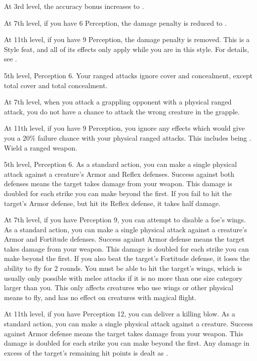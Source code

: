     At 3rd level, the accuracy bonus increases to .

    At 7th level, if you have 6 Perception, the damage penalty is reduced to .

    At 11th level, if you have 9 Perception, the damage penalty is removed.
     This is a Style feat, and all of its effects only apply while you are in this style.
    For details, see .

    \featpres 5th level, Perception 6.
    \featben Your ranged attacks ignore cover and concealment, except total cover and total concealment.

    At 7th level, when you attack a grappling opponent with a physical ranged attack, you do not have a chance to attack the wrong creature in the grapple.

    At 11th level, if you have 9 Perception, you ignore any effects which would give you a 20\% failure chance with your physical ranged attacks.
    This includes being \impaired.
    \stylereq Wield a ranged weapon.

    \featpre 5th level, Perception 6.
    \featben As a standard action, you can make a single physical attack against a creature's Armor and Reflex defenses.
    Success against both defenses means the target takes damage from your weapon.
    This damage is doubled for each strike you can make beyond the first.
    If you fail to hit the target's Armor defense, but hit its Reflex defense, it takes half damage.

    At 7th level, if you have Perception 9, you can attempt to disable a foe's wings.
    As a standard action, you can make a single physical attack against a creature's Armor and Fortitude defenses.
    Success against Armor defense means the target takes damage from your weapon.
    This damage is doubled for each strike you can make beyond the first.
    If you also beat the target's Fortitude defense, it loses the ability to fly for 2 rounds.
    You must be able to hit the target's wings, which is usually only possible with melee attacks if it is no more than one size category larger than you.
    This only affects creatures who use wings or other physical means to fly, and has no effect on creatures with magical flight.

    At 11th level, if you have Perception 12, you can deliver a killing blow.
    As a standard action, you can make a single physical attack against a creature.
    Success against Armor defense means the target takes damage from your weapon.
    This damage is doubled for each strike you can make beyond the first.
    Any damage in excess of the target's remaining hit points is dealt as .

